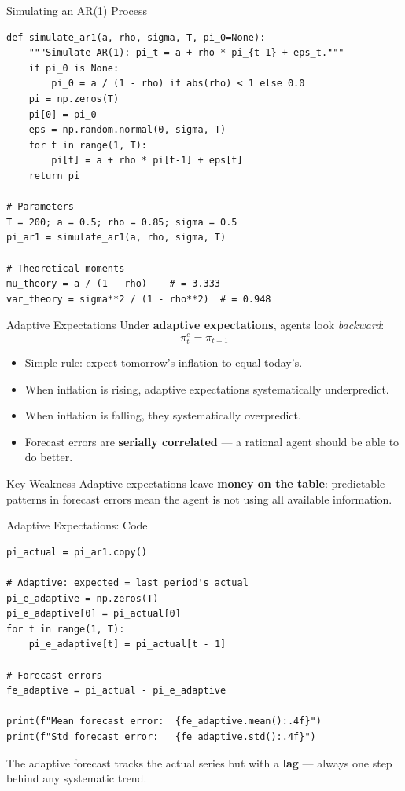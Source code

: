 \documentclass[aspectratio=169, 10pt]{beamer}
\begin{document}
\begin{frame}[fragile]{Simulating an AR(1) Process}
\begin{lstlisting}
def simulate_ar1(a, rho, sigma, T, pi_0=None):
    """Simulate AR(1): pi_t = a + rho * pi_{t-1} + eps_t."""
    if pi_0 is None:
        pi_0 = a / (1 - rho) if abs(rho) < 1 else 0.0
    pi = np.zeros(T)
    pi[0] = pi_0
    eps = np.random.normal(0, sigma, T)
    for t in range(1, T):
        pi[t] = a + rho * pi[t-1] + eps[t]
    return pi

# Parameters
T = 200; a = 0.5; rho = 0.85; sigma = 0.5
pi_ar1 = simulate_ar1(a, rho, sigma, T)

# Theoretical moments
mu_theory = a / (1 - rho)    # = 3.333
var_theory = sigma**2 / (1 - rho**2)  # = 0.948
\end{lstlisting}
\end{frame}

\begin{frame}{Adaptive Expectations}
Under \textbf{adaptive expectations}, agents look \textit{backward}:
\[
  \pi^e_t = \pi_{t-1}
\]

\vspace{0.3em}
\begin{itemize}
  \item Simple rule: expect tomorrow's inflation to equal today's.
  \item When inflation is rising, adaptive expectations systematically
        \alert{underpredict}.
  \item When inflation is falling, they systematically \alert{overpredict}.
  \item Forecast errors are \textbf{serially correlated} --- a rational
        agent should be able to do better.
\end{itemize}

\vspace{0.5em}
\begin{alertblock}{Key Weakness}
Adaptive expectations leave \textbf{money on the table}:
predictable patterns in forecast errors mean the agent is not using
all available information.
\end{alertblock}
\end{frame}

\begin{frame}[fragile]{Adaptive Expectations: Code}
\begin{lstlisting}
pi_actual = pi_ar1.copy()

# Adaptive: expected = last period's actual
pi_e_adaptive = np.zeros(T)
pi_e_adaptive[0] = pi_actual[0]
for t in range(1, T):
    pi_e_adaptive[t] = pi_actual[t - 1]

# Forecast errors
fe_adaptive = pi_actual - pi_e_adaptive

print(f"Mean forecast error:  {fe_adaptive.mean():.4f}")
print(f"Std forecast error:   {fe_adaptive.std():.4f}")
\end{lstlisting}
\vspace{0.3em}
The adaptive forecast tracks the actual series but with a \textbf{lag} ---
always one step behind any systematic trend.
\end{frame}
\end{document}
